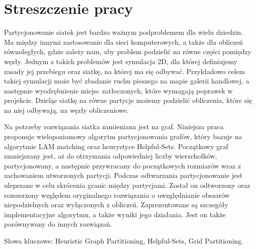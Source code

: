 \section{Streszczenie pracy}
Partycjonowanie siatek jest bardzo ważnym podproblemem dla wielu dziedzin.
Ma między innymi zastosowanie dla sieci komputerowych, a także dla obliczeń równoległych, gdzie zależy nam,
aby problem podzielić na równe części pomiędzy węzły.
Jednym z takich problemów jest symulacja $2$D, dla której definiujemy zasady jej przebiegu oraz siatkę, na której ma się odbywać.
Przykładowo celem takiej symulacji może być zbadanie ruchu pieszego na mapie galerii handlowej, a następnie wyodrębnienie miejsc
zatłoczonych, które wymagają poprawek w projekcie.
Dzieląc siatkę na równe partycje możemy podzielić obliczenia, które się na niej odbywają, na węzły obliczeniowe.

Na potrzeby rozwiązania siatka zamieniana jest na graf.
Niniejsza praca proponuje wielopoziomowy algorytm partycjonowania grafów, który bazuje na algorytmie LAM
matching oraz heurystyce Helpful-Sets.
Początkowy graf zmniejszany jest, aż do otrzymania odpowiedniej liczby wierzchołków, partycjonowany, a następnie
przywracany do początkowych rozmiarów wraz z zachowaniem utworzonych partycji.
Podczas odtwarzania partycjonowanie jest ulepszane w celu skrócenia granic między partycjami.
Został on odtworzony oraz rozszerzony względem oryginalnego rozwiązania o uwzględnianie obszarów niepodzielnych
oraz wyłączonych z obliczeń.
Zaprezentowane są szczegóły implementacyjne algorytmu, a także wyniki jego działania.
Jest on także porównywany do innych rozwiązań.

\newline
\vspace{10mm}

Słowa kluczowe: Heuristic Graph Partitioning, Helpful-Sets, Grid Partitioning.